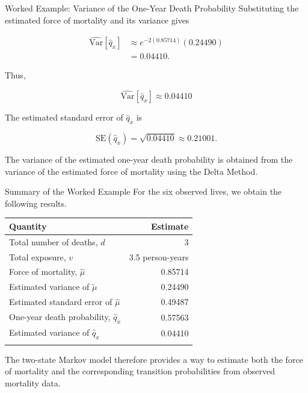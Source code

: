 \documentclass[
  ignorenonframetext,
  aspectratio=169,
]{beamer}
\newcounter{none} %
\begin{document}
\begin{frame}{Worked Example: Variance of the One-Year Death
Probability}
\protect{}\label{worked-example-variance-of-the-one-year-death-probability}
Substituting the estimated force of mortality and its variance gives

\[
\begin{aligned}
\widehat{\mathrm{Var}}[\hat{q}_x]
&\approx e^{-2(0.85714)}(0.24490)\\
&=0.04410.
\end{aligned}
\]

Thus,

\[
\boxed{
\widehat{\mathrm{Var}}[\hat{q}_x]
\approx 0.04410
}
\]

The estimated standard error of \(\hat{q}_x\) is

\[
\mathrm{SE}(\hat{q}_x)
=\sqrt{0.04410}
\approx 0.21001.
\]

The variance of the estimated one-year death probability is obtained
from the variance of the estimated force of mortality using the Delta
Method.
\end{frame}

\begin{frame}{Summary of the Worked Example}
\protect{}\label{summary-of-the-worked-example}
For the six observed lives, we obtain the following results.

{\def\LTcaptype{none} %
\begin{longtable}[]{@{}lr@{}}
\toprule\noalign{}
Quantity & Estimate \\
\midrule\noalign{}
\endhead
Total number of deaths, \(d\) & 3 \\
Total exposure, \(v\) & 3.5 person-years \\
Force of mortality, \(\hat{\mu}\) & 0.85714 \\
Estimated variance of \(\tilde{\mu}\) & 0.24490 \\
Estimated standard error of \(\hat{\mu}\) & 0.49487 \\
One-year death probability, \(\hat{q}_x\) & 0.57563 \\
Estimated variance of \(\hat{q}_x\) & 0.04410 \\
\bottomrule\noalign{}
\end{longtable}
}

The two-state Markov model therefore provides a way to estimate both the
force of mortality and the corresponding transition probabilities from
observed mortality data.
\end{frame}
\end{document}
